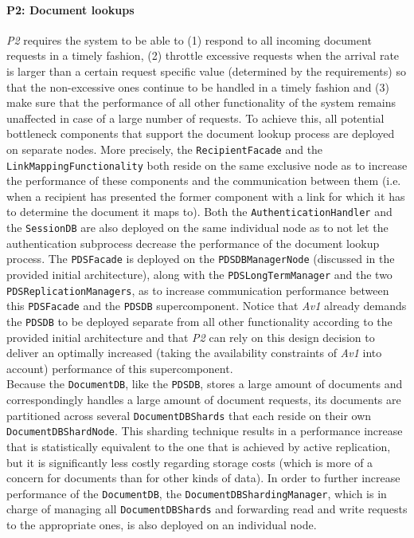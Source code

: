 \documentclass[a4paper,10pt]{article}
\begin{document}
\paragraph{P2\@: Document lookups}
\textit{P2} requires the system to be able to (1) respond to all incoming document requests in a timely fashion, (2) throttle excessive requests when the arrival rate is larger than a certain request specific value (determined by the requirements) so that the non-excessive ones continue to be handled in a timely fashion and (3) make sure that the performance of all other functionality of the system remains unaffected in case of a large number of requests. To achieve this, all potential bottleneck components that support the document lookup process are deployed on separate nodes. More precisely, the \texttt{RecipientFacade} and the \texttt{LinkMappingFunctionality} both reside on the same exclusive node as to increase the performance of these components and the communication between them (i.e. when a recipient has presented the former component with a link for which it has to determine the document it maps to). Both the \texttt{AuthenticationHandler} and the \texttt{SessionDB} are also deployed on the same individual node as to not let the authentication subprocess decrease the performance of the document lookup process. The \texttt{PDSFacade} is deployed on the \texttt{PDSDBManagerNode} (discussed in the provided initial architecture), along with the \texttt{PDSLongTermManager} and the two \texttt{PDSReplicationManagers}, as to increase communication performance between this \texttt{PDSFacade} and the \texttt{PDSDB} supercomponent. Notice that \textit{Av1} already demands the \texttt{PDSDB} to be deployed separate from all other functionality according to the provided initial architecture and that \textit{P2} can rely on this design decision to deliver an optimally increased (taking the availability constraints of \textit{Av1} into account) performance of this supercomponent.\\
Because the \texttt{DocumentDB}, like the \texttt{PDSDB}, stores a large amount of documents and correspondingly handles a large amount of document requests, its documents are partitioned across several \texttt{DocumentDBShards} that each reside on their own \texttt{DocumentDBShardNode}. This sharding technique results in a performance increase that is statistically equivalent to the one that is achieved by active replication, but it is significantly less costly regarding storage costs (which is more of a concern for documents than for other kinds of data). In order to further increase performance of the \texttt{DocumentDB}, the \texttt{DocumentDBShardingManager}, which is in charge of managing all \texttt{DocumentDBShards} and forwarding read and write requests to the appropriate ones, is also deployed on an individual node.\\
\end{document}
